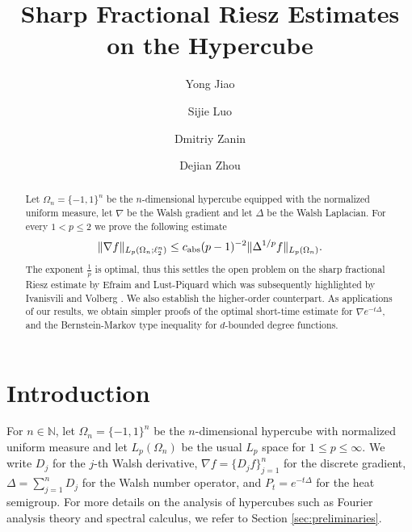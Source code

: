\documentclass{amsart}
\title{Sharp Fractional Riesz Estimates on the Hypercube}
\author[Jiao]{Yong Jiao}
\author[Luo]{Sijie Luo}
\author[Zanin]{Dmitriy Zanin}
\author[Zhou]{Dejian Zhou}
\date{}
\newcommand{\N}{\mathbb N}
\numberwithin{equation}{section}
\theoremstyle{definition}
\theoremstyle{remark}
\newcommand{\1}{\mathbf 1}
\begin{document}
\begin{abstract}
Let $\Omega_{n}=\{-1,1\}^n$ be the $n$-dimensional hypercube equipped with the normalized uniform measure, let $\nabla$ be the Walsh gradient and let $\Delta$ be the Walsh Laplacian.  For
every $1<p\leq 2$ we prove the following estimate
\[
\|\nabla f\|_{L_p(\Omega_n;\ell_2^n)} \leq c_{{\rm abs}}(p-1)^{-2}\|\Delta^{1/p}f\|_{L_p(\Omega_n)}.
\]
The exponent $\frac1p$ is optimal, thus this settles the open problem on the sharp fractional Riesz estimate by Efraim and Lust-Piquard \cite{E-LP2008} which was subsequently highlighted by Ivanisvili and Volberg \cite{I-V2022}. We also establish the higher-order counterpart. As applications of our results, we obtain simpler proofs of the optimal short-time estimate for $\nabla e^{-t\Delta}$, and the Bernstein-Markov type inequality for $d$-bounded degree functions.
\end{abstract}

\maketitle


\section{Introduction}

For $n\in\N$, let $\Omega_{n}=\{-1,1\}^{n}$ be the $n$-dimensional hypercube with normalized uniform measure and let $L_{p}(\Omega_{n})$ be the usual $L_{p}$ space for $1\leq p\leq \infty$.  We write $D_{j}$ for the $j$-th Walsh derivative, $\nabla f=\{D_{j}f\}_{j=1}^{n}$ for the discrete gradient, $\Delta=\sum_{j=1}^{n}D_{j}$ for the Walsh number operator, and $P_{t}=e^{-t\Delta}$ for the heat semigroup. For more details on the analysis of hypercubes such as Fourier analysis theory and spectral calculus, we refer to Section \ref{sec:preliminaries}.
\end{document}
